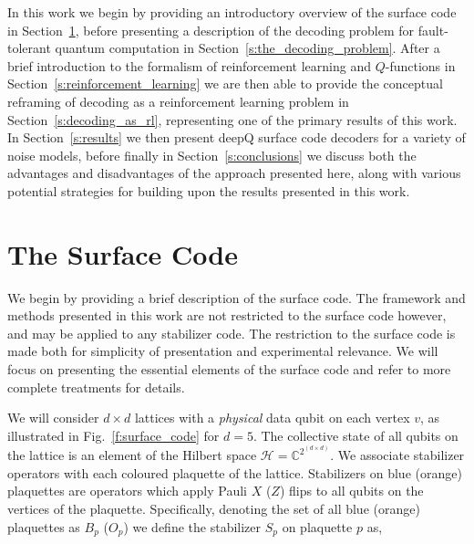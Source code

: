 \documentclass[twocolumn,preprintnumbers,amsmath,amssymb,notitlepage,nofootinbib,longbibliography,superscriptaddress,aps,pra,10pt]{revtex4-1}
\begin{document}
	In this work we begin by providing an introductory overview of the surface code in Section~\ref{s:the_surface_code}, before presenting a description of the decoding problem for fault-tolerant quantum computation in Section~\ref{s:the_decoding_problem}.
	After a brief introduction to the formalism of reinforcement learning and $Q$-functions in Section~\ref{s:reinforcement_learning} we are then able to provide the conceptual reframing of decoding as a reinforcement learning problem in Section~\ref{s:decoding_as_rl}, representing one of the primary results of this work.
	In Section~\ref{s:results} we then present deepQ surface code decoders for a variety of noise models, before finally in Section~\ref{s:conclusions} we discuss both the advantages and disadvantages of the approach presented here, along with various potential strategies for building upon the results presented in this work.

\section{The Surface Code}\label{s:the_surface_code}

	We begin by providing a brief description of the surface code.
	The framework and methods presented in this work are not restricted to the surface code however, and may be applied to any stabilizer code.
	The restriction to the surface code is made both for simplicity of presentation and experimental relevance.
	We will focus on presenting the essential elements of the surface code and refer to more complete treatments for details.

	We will consider $d\times d$ lattices with a \textit{physical} data qubit on each vertex $v$, as illustrated in Fig.~\ref{f:surface_code} for $d=5$.
	The collective state of all qubits on the lattice is an element of the Hilbert space $\mathcal{H} = \mathbb{C}^{2^{(d\times d)}}$.
	We associate stabilizer operators with each coloured plaquette of the lattice.
	Stabilizers on blue (orange) plaquettes are operators which apply Pauli $X$ ($Z$) flips to all qubits on the vertices of the plaquette.
	Specifically, denoting the set of all blue (orange) plaquettes as $B_p$ ($O_p$) we define the stabilizer $S_p$ on plaquette $p$ as,
\end{document}
